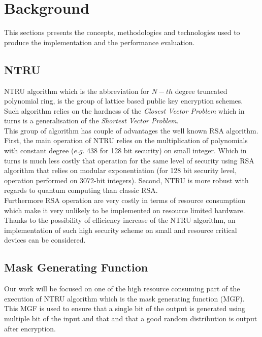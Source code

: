 \section{Background}

This sections presents the concepts, methodologies and technologies used to produce the implementation and the performance evaluation.

\subsection{NTRU}
NTRU algorithm which is the abbreviation for $N-th$ degree truncated polynomial ring, is the group of lattice based public key encryption schemes.\\
Such algorithm relies on the hardness of the \textit{Closest Vector Problem} which in turns is a generalisation of the \textit{Shortest Vector Problem}.\\
This group of algorithm has couple of advantages the well known RSA algorithm. First, the main operation of NTRU relies on the multiplication of polynomials with constant degree ($e.g.$ 438 for 128 bit security) on small integer. Which in turns is much less costly that operation for the same level of security using RSA algorithm that relies on modular exponentiation (for 128 bit security level, operation performed on 3072-bit integers). Second, NTRU is more robust with regards to quantum computing than classic RSA.\\
Furthermore RSA operation are very costly in terms of resource consumption which make it very unlikely to be implemented on resource limited hardware. Thanks to the possibility of efficiency increase of the NTRU algorithm, an implementation of such high security scheme on small and resource critical devices can be considered.
\subsection{Mask Generating Function}
Our work will be focused on one of the high resource consuming part of the execution of NTRU algorithm which is the mask generating function (MGF). This MGF is used to ensure that a single bit of the output is generated using multiple bit of the input and that and that a good random distribution is output after encryption.\\


